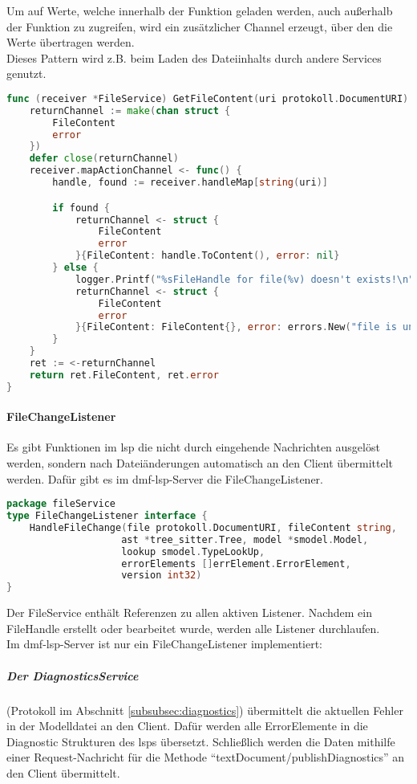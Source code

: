 \documentclass[./einleitung.tex]{subfiles}
\begin{document}
    Um auf Werte, welche innerhalb der Funktion geladen werden, auch außerhalb der Funktion zu zugreifen, wird ein zusätzlicher Channel erzeugt, über den die Werte übertragen werden.\\
    Dieses Pattern wird z.B. beim Laden des Dateiinhalts durch andere Services genutzt.
    \begin{lstlisting}[language=Go, captio=Laden eines FileHandles]
func (receiver *FileService) GetFileContent(uri protokoll.DocumentURI) (FileContent, error) {
	returnChannel := make(chan struct {
		FileContent
		error
	})
	defer close(returnChannel)
	receiver.mapActionChannel <- func() {
		handle, found := receiver.handleMap[string(uri)]

		if found {
			returnChannel <- struct {
				FileContent
				error
			}{FileContent: handle.ToContent(), error: nil}
		} else {
			logger.Printf("%sFileHandle for file(%v) doesn't exists!\n", logService.ERROR, uri)
			returnChannel <- struct {
				FileContent
				error
			}{FileContent: FileContent{}, error: errors.New("file is unknown")}
		}
	}
	ret := <-returnChannel
	return ret.FileContent, ret.error
}
    \end{lstlisting}

    \paragraph{FileChangeListener}
    Es gibt Funktionen im \acrshort{lsp} die nicht durch eingehende Nachrichten ausgelöst werden, sondern nach Dateiänderungen automatisch an den Client übermittelt werden.
    Dafür gibt es im \acrshort{dmf}-\acrshort{lsp}-Server die FileChangeListener.
    \begin{lstlisting}[language=Go]
package fileService
type FileChangeListener interface {
	HandleFileChange(file protokoll.DocumentURI, fileContent string,
                    ast *tree_sitter.Tree, model *smodel.Model,
                    lookup smodel.TypeLookUp,
                    errorElements []errElement.ErrorElement,
                    version int32)
}
    \end{lstlisting}
    Der FileService enthält Referenzen zu allen aktiven Listener.
    Nachdem ein FileHandle erstellt oder bearbeitet wurde, werden alle Listener durchlaufen.\\
    Im \acrshort{dmf}-\acrshort{lsp}-Server ist nur ein FileChangeListener implementiert:
    \subparagraph[DiagnosticsService]{Der DiagnosticsService }\label{subsubsec:diagnostics-service}
    (Protokoll im Abschnitt \ref{subsubsec:diagnostics})
    übermittelt die aktuellen Fehler in der Modelldatei an den Client.
    Dafür werden alle ErrorElemente in die Diagnostic Strukturen des \acrshort{lsp}s übersetzt.
    Schließlich werden die Daten mithilfe einer Request-Nachricht für die Methode ``textDocument/publishDiagnostics'' an den Client übermittelt.
\end{document}
